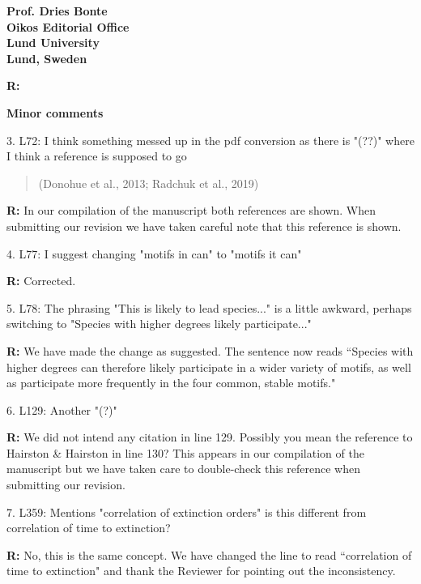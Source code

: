 \documentclass[12pt]{letter}
\begin{document}
\begin{letter}{\bf Prof. Dries Bonte\\
Oikos Editorial Office \\
Lund University \\
Lund, Sweden}
    \smallskip

    \textbf{R:} %

    \smallskip


  \textbf{Minor comments}

    3. L72: I think something messed up in the pdf conversion as there is "(??)" where I think a reference is supposed to go
    \begin{quotation}
    (Donohue et al., 2013; Radchuk et al., 2019)
    \end{quotation}

    \smallskip

    \textbf{R:} In our compilation of the manuscript both references are shown. When submitting our revision we have taken careful note that this reference is shown.

    \smallskip

    4. L77: I suggest changing "motifs in can" to "motifs it can"

    \smallskip

    \textbf{R:} Corrected.

    \smallskip

    5. L78: The phrasing "This is likely to lead species..." is a little awkward, perhaps switching to "Species with higher degrees likely participate..."

    \smallskip

    \textbf{R:} We have made the change as suggested. The sentence now reads ``Species with higher degrees can therefore likely participate in a wider variety of motifs, as well as participate more frequently in the four common, stable motifs."

    \smallskip

    6. L129: Another "(?)"

    \smallskip

    \textbf{R:} We did not intend any citation in line 129. Possibly you mean the reference to Hairston \& Hairston in line 130? This appears in our compilation of the manuscript but we have taken care to double-check this reference when submitting our revision.%

    \smallskip

    7. L359: Mentions "correlation of extinction orders" is this different from correlation of time to extinction?

    \smallskip

    \textbf{R:} No, this is the same concept. We have changed the line to read ``correlation of time to extinction" and thank the Reviewer for pointing out the inconsistency.


\end{letter}
\end{document}
